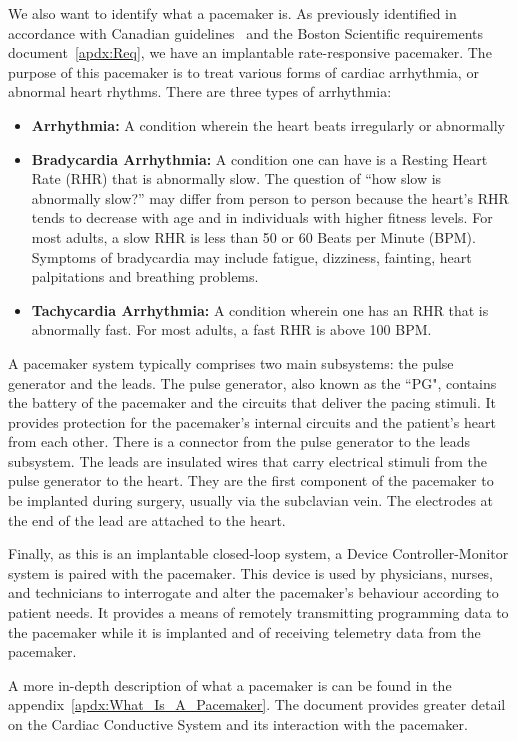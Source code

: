 We also want to identify what a pacemaker is. As previously identified in accordance with Canadian guidelines~\cite{CanadaGuidanceDocument, VerifyDevices} and the Boston Scientific requirements document~\ref{apdx:Req}, we have an implantable rate-responsive pacemaker. The purpose of this pacemaker is to treat various forms of cardiac arrhythmia, or abnormal heart rhythms. There are three types of arrhythmia:
\begin{itemize}
	\item \textbf{Arrhythmia:} A condition wherein the heart beats irregularly or abnormally
	\item \textbf{Bradycardia Arrhythmia:} A condition one can have is a Resting Heart Rate (RHR) that is abnormally slow. The question of “how slow is abnormally slow?” may differ from person to person because the heart’s RHR tends to decrease with age and in individuals with higher fitness levels. For most adults, a slow RHR is less than 50 or 60 Beats per Minute (BPM). Symptoms of bradycardia may include fatigue, dizziness, fainting, heart palpitations and breathing problems.
	\item \textbf{Tachycardia Arrhythmia:} A condition wherein one has an RHR that is abnormally fast. For most adults, a fast RHR is above 100 BPM.
\end{itemize}

A pacemaker system typically comprises two main subsystems: the pulse generator and the leads. The pulse generator, also known as the ``PG", contains the battery of the pacemaker and the circuits that deliver the pacing stimuli. It provides protection for the pacemaker's internal circuits and the patient's heart from each other. There is a connector from the pulse generator to the leads subsystem. The leads are insulated wires that carry electrical stimuli from the pulse generator to the heart. They are the first component of the pacemaker to be implanted during surgery, usually via the subclavian vein. The electrodes at the end of the lead are attached to the heart.

Finally, as this is an implantable closed-loop system, a Device Controller-Monitor system is paired with the pacemaker. This device is used by physicians, nurses, and technicians to interrogate and alter the pacemaker's behaviour according to patient needs. It provides a means of remotely transmitting programming data to the pacemaker while it is implanted and of receiving telemetry data from the pacemaker.

A more in-depth description of what a pacemaker is can be found in the appendix~\ref{apdx:What_Is_A_Pacemaker}. The document provides greater detail on the Cardiac Conductive System and its interaction with the pacemaker.

